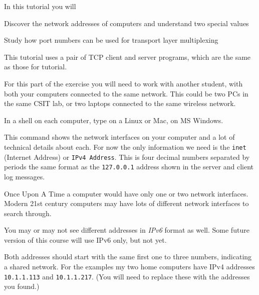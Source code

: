 










In this tutorial you will

\DOT Discover the network addresses of computers and understand two special values

\DOT Study how port numbers can be used for transport layer multiplexing

This tutorial uses a pair of TCP client and server programs, which are the same as
those for  tutorial.


For this part of the exercise you will need to work with another student, with both your
computers connected to the same network. This could be two PCs in the same CSIT lab, or
two laptops connected to the same wireless network.

\STEP In a shell on each computer, type  on a Linux or Mac,
 on MS Windows.

This command shows the network interfaces on your computer and a lot of technical details
about each. For now the only information we need is the \texttt{inet} (Internet Address)
or \texttt{IPv4 Address}. This is four decimal numbers separated by periods \DSH the same
format as the \texttt{127.0.0.1} address shown in the server and client log messages.

\begin{IMPORTANT}
Once Upon A Time a computer would have only one or two network interfaces. Modern 21st
century computers may have lots of different network interfaces to search through.

You may or may not see different addresses in \emph{IPv6} format as well. Some future version
of this course will use IPv6 only, but not yet.
\end{IMPORTANT}

Both addresses should start with the same first one to three numbers, indicating a
shared network.
For the examples my two home computers have IPv4 addresses \texttt{10.1.1.113}
and \texttt{10.1.1.217}. (You will need to replace these with the addresses you found.)

